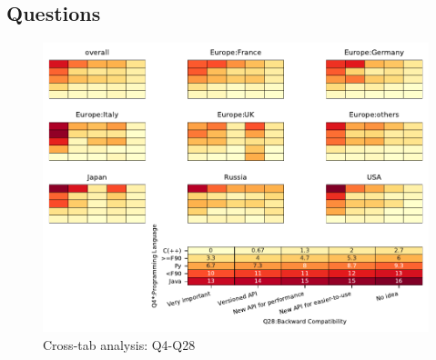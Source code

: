 
\subsection{Questions}


\begin{figure}
\begin{center}
\includegraphics[width=12cm]{../pdfs/Q4-Q28.pdf}
\caption{Cross-tab analysis: Q4-Q28}
\label{fig:Q4-Q28}
\end{center}
\end{figure}
